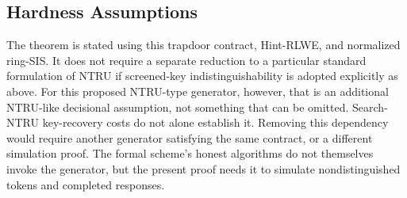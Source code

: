 \documentclass[lettersize,journal]{IEEEtran}
\begin{document}
	\subsection{Hardness Assumptions}
	The theorem is stated using this trapdoor contract, Hint-RLWE, and
	normalized ring-SIS. It does not require a separate reduction to a
	particular standard formulation of NTRU if screened-key
	indistinguishability is adopted explicitly as above. For this proposed
	NTRU-type generator, however, that is an additional NTRU-like
	decisional assumption, not something that can be omitted. Search-NTRU
	key-recovery costs do not alone establish it. Removing this dependency
	would require another generator satisfying the same contract, or a
	different simulation proof. The formal scheme's honest algorithms do
	not themselves invoke the generator, but the present proof needs it
	to simulate nondistinguished tokens and completed responses.
	
	
\end{document}
